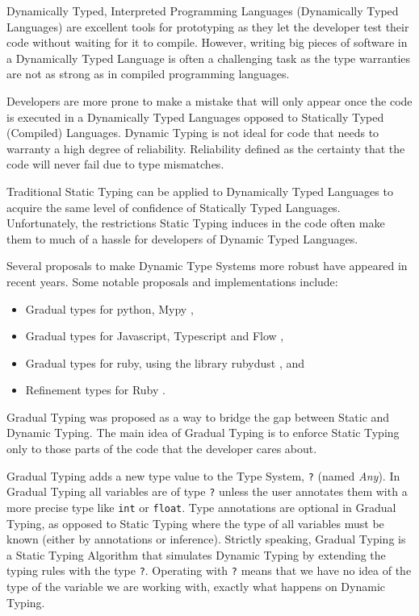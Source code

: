 \documentclass[
11pt, %
english, %
singlespacing, %
headsepline, %
]{MastersDoctoralThesis} %
\providecommand{\tightlist}{%
  \setlength{\itemsep}{0pt}\setlength{\parskip}{0pt}}
\begin{document}
Dynamically Typed, Interpreted Programming Languages (Dynamically Typed
Languages) are excellent tools for prototyping as they let the developer
test their code without waiting for it to compile. However, writing big
pieces of software in a Dynamically Typed Language is often a
challenging task as the type warranties are not as strong as in compiled
programming languages.

Developers are more prone to make a mistake that will only appear once
the code is executed in a Dynamically Typed Languages opposed to
Statically Typed (Compiled) Languages. Dynamic Typing is not ideal for
code that needs to warranty a high degree of reliability. Reliability
defined as the certainty that the code will never fail due to type
mismatches.

Traditional Static Typing can be applied to Dynamically Typed Languages
to acquire the same level of confidence of Statically Typed Languages.
Unfortunately, the restrictions Static Typing induces in the code often
make them to much of a hassle for developers of Dynamic Typed Languages.

Several proposals to make Dynamic Type Systems more robust have appeared
in recent years. Some notable proposals and implementations include:

\begin{itemize}
\tightlist
\item
  Gradual types for python, Mypy \autocite{lehtosalo2016mypy},
\item
  Gradual types for Javascript, Typescript
  \autocites{bierman2014understanding}{hejlsberg2012introducing} and
  Flow \autocite{chaudhuri2016flow},
\item
  Gradual types for ruby, using the library rubydust
  \autocite{an_dynamic_2011}, and
\item
  Refinement types for Ruby \autocite{kazerounian_refinement_2017}.
\end{itemize}

Gradual Typing \autocite{siek_gradual_2006} was proposed as a way to
bridge the gap between Static and Dynamic Typing. The main idea of
Gradual Typing is to enforce Static Typing only to those parts of the
code that the developer cares about.

Gradual Typing adds a new type value to the Type System, \texttt{?}
(named \emph{Any}). In Gradual Typing all variables are of type
\texttt{?} unless the user annotates them with a more precise type like
\texttt{int} or \texttt{float}. Type annotations are optional in Gradual
Typing, as opposed to Static Typing where the type of all variables must
be known (either by annotations or inference). Strictly speaking,
Gradual Typing is a Static Typing Algorithm that simulates Dynamic
Typing by extending the typing rules with the type \texttt{?}. Operating
with \texttt{?} means that we have no idea of the type of the variable
we are working with, exactly what happens on Dynamic Typing.
\end{document}
